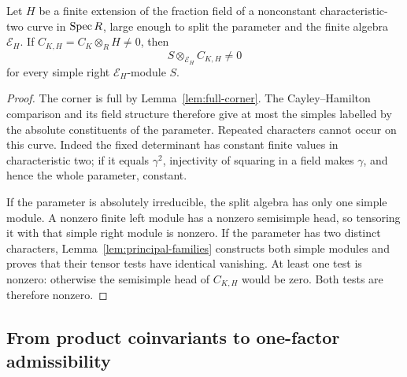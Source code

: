 \begin{lemma}\label{lem:curve-support}
Let \(H\) be a finite extension of the fraction field of a nonconstant
characteristic-two curve in \(\operatorname{Spec} R\), large enough to split the
parameter and the finite algebra \(\mathcal E_H\). If
\(C_{K,H}=C_K\otimes_RH\ne0\), then
\[
                  S\otimes_{\mathcal E_H}C_{K,H}\ne0
\]
for every simple right \(\mathcal E_H\)-module \(S\).
\end{lemma}
\begin{proof}
The corner is full by Lemma~\ref{lem:full-corner}. The
Cayley--Hamilton comparison and its field structure therefore give
at most the simples labelled by the absolute constituents of the
parameter. Repeated characters cannot occur on this curve. Indeed
the fixed determinant has constant finite values in characteristic
two; if it equals \(\gamma^2\), injectivity of squaring in a field
makes \(\gamma\), and hence the whole parameter, constant.

If the parameter is absolutely irreducible, the split algebra has only
one simple module. A nonzero finite left module has a nonzero
semisimple head, so tensoring it with that simple right module is
nonzero. If the parameter has two distinct characters,
Lemma~\ref{lem:principal-families} constructs both simple
modules and proves that their tensor tests have identical vanishing.
At least one test is nonzero: otherwise the semisimple head of \(C_{K,H}\) would be
zero. Both tests are therefore nonzero.
\end{proof}

\subsection{From product coinvariants to one-factor admissibility}

